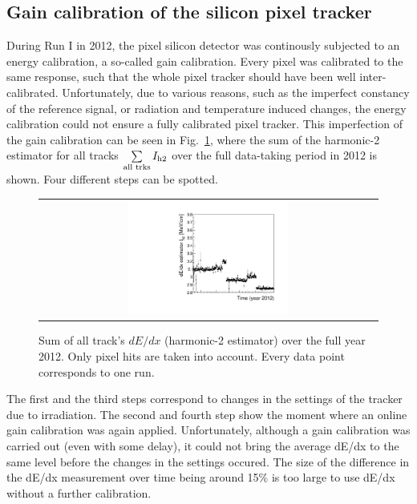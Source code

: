 \subsection{Gain calibration of the silicon pixel tracker}

During Run I in 2012, the pixel silicon detector was continously subjected to an energy calibration, a so-called gain calibration.
Every pixel was calibrated to the same response, such that the whole pixel tracker should have been well inter-calibrated.
Unfortunately, due to various reasons, such as the imperfect constancy of the reference signal, or radiation and temperature induced changes, the energy calibration could not ensure a fully calibrated pixel tracker.
This imperfection of the gain calibration can be seen in Fig.~\ref{fig:StabilityPlot_beforeCalibration}, where the sum of the harmonic-2 estimator for all tracks $\sum\limits_{\text{all trks}}I_{\text{h2}}$ over the full data-taking period in 2012 is shown.
Four different steps can be spotted.
\begin{figure}[!b]
  \centering 
  \begin{tabular}{c}
  \includegraphics[width=0.49\textwidth]{figures/analysis/StabilityPlot_Pixel_beforeCalibration_withoutStepFits_NEW.pdf}
  \end{tabular}
  \caption{Sum of all track's $dE/dx$ (harmonic-2 estimator) over the full year 2012. Only pixel hits are taken into account. Every data point corresponds to one run.} 
  \label{fig:StabilityPlot_beforeCalibration}
\end{figure}
The first and the third steps correspond to changes in the settings of the tracker due to irradiation.
The second and fourth step show the moment where an online gain calibration was again applied.
Unfortunately, although a gain calibration was carried out (even with some delay), it could not bring the average dE/dx to the same level before the changes in the settings occured.
The size of the difference in the dE/dx measurement over time being around 15\% is too large to use dE/dx without a further calibration.

